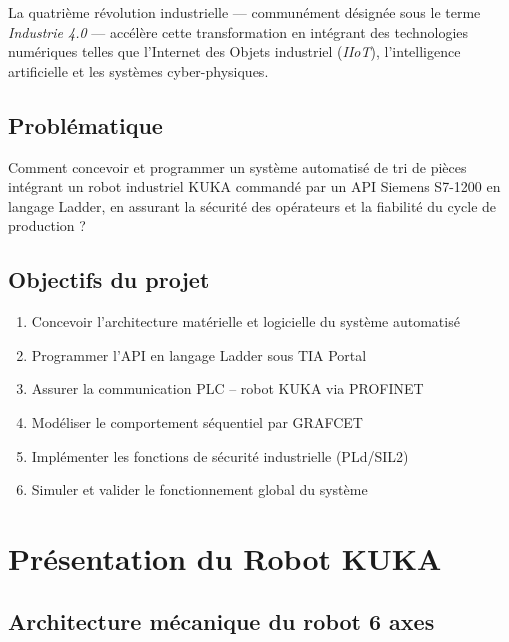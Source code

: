 \documentclass[12pt, a4paper]{report}
\newcommand{\api}{API}
\newcommand{\kuka}{KUKA}
\newcommand{\profinet}{PROFINET}
\newcommand{\tia}{TIA Portal}
\newcommand{\siemens}{Siemens S7-1200}
\begin{document}
La quatri\`eme r\'evolution industrielle --- communément d\'esign\'ee sous le terme
\emph{Industrie 4.0} --- acc\'el\`ere cette transformation en int\'egrant des technologies
num\'eriques telles que l'Internet des Objets industriel (\emph{IIoT}),
l'intelligence artificielle et les syst\`emes cyber-physiques.

\section{Probl\'ematique}

\begin{alertbox}
  Comment concevoir et programmer un syst\`eme automatis\'e de tri de pi\`eces int\'egrant
  un robot industriel \kuka{} command\'e par un \api{} \siemens{} en langage Ladder,
  en assurant la s\'ecurit\'e des op\'erateurs et la fiabilit\'e du cycle de production ?
\end{alertbox}

\section{Objectifs du projet}

\begin{enumerate}[label=\textbf{\arabic*.}, leftmargin=*, itemsep=4pt]
  \item Concevoir l'architecture mat\'erielle et logicielle du syst\`eme automatis\'e
  \item Programmer l'\api{} en langage Ladder sous \tia{}
  \item Assurer la communication PLC -- robot \kuka{} via \profinet{}
  \item Mod\'eliser le comportement s\'equentiel par GRAFCET
  \item Impl\'ementer les fonctions de s\'ecurit\'e industrielle (PLd/SIL2)
  \item Simuler et valider le fonctionnement global du syst\`eme
\end{enumerate}

\chapter{Pr\'esentation du Robot KUKA}
\label{chap:kuka}

\section{Architecture m\'ecanique du robot 6 axes}
\end{document}
